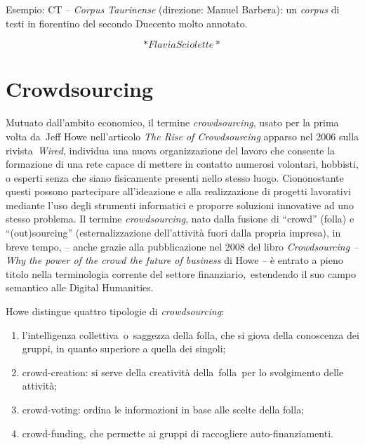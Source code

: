 \documentclass[
  b5paper,
  twoside,
  11pt,
  chapterprefix=false,
  bibliography=totocnumbered,
  parskip=0]{scrbook}
\begin{document}
Esempio: CT -- \emph{Corpus Taurinense} (direzione: Manuel Barbera): un
\emph{corpus} di testi in fiorentino del secondo Duecento molto annotato.

\[*Flavia Sciolette*\]

\hypertarget{crowdsourcing}{%
\chapter{Crowdsourcing}\label{crowdsourcing}}

Mutuato dall'ambito economico, il termine \emph{crowdsourcing}, usato per la
prima volta da~Jeff Howe nell'articolo \emph{The Rise of Crowdsourcing}
apparso nel 2006 sulla rivista~\emph{Wired}, individua una nuova
organizzazione del lavoro che consente la formazione di una rete capace
di mettere in contatto numerosi volontari, hobbisti, o esperti senza che
siano fisicamente presenti nello stesso luogo. Ciononostante questi
possono partecipare all'ideazione e alla realizzazione di progetti
lavorativi mediante l'uso degli strumenti informatici e proporre
soluzioni innovative ad uno stesso problema. Il termine \emph{crowdsourcing},
nato dalla fusione di \enquote{crowd} (folla) e \enquote{(out)sourcing}
(esternalizzazione dell'attività fuori dalla propria impresa), in breve
tempo, -- anche grazie alla pubblicazione nel 2008 del libro
\emph{Crowdsourcing -- Why the power of the crowd the future of business} di
Howe -- è entrato a pieno titolo nella terminologia corrente del settore
finanziario,~estendendo il suo campo semantico alle Digital Humanities.

Howe distingue quattro tipologie di \emph{crowdsourcing}:

\begin{enumerate}
\def\labelenumi{\arabic{enumi}.}
\item
  l'intelligenza collettiva~o~saggezza della folla, che si giova della
  conoscenza dei gruppi, in quanto superiore a quella dei singoli;
\item
  crowd-creation: si serve della creatività della~folla~per lo
  svolgimento delle attività;
\item
  crowd-voting: ordina le informazioni in base alle scelte della
  folla;
\item
  crowd-funding, che permette ai gruppi di raccogliere
  auto-finanziamenti.
\end{enumerate}
\end{document}
